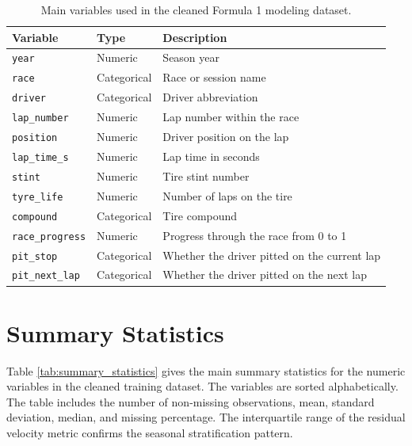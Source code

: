 \documentclass[11pt,oneside,openany]{book}
\begin{document}
\begin{table}[H]
\centering
\caption{Main variables used in the cleaned Formula 1 modeling dataset.}
\label{tab:main_variables}
\small
\begin{tabular}{lll}
\toprule
Variable & Type & Description \\
\midrule
\texttt{year} & Numeric & Season year \\
\texttt{race} & Categorical & Race or session name \\
\texttt{driver} & Categorical & Driver abbreviation \\
\texttt{lap\_number} & Numeric & Lap number within the race \\
\texttt{position} & Numeric & Driver position on the lap \\
\texttt{lap\_time\_s} & Numeric & Lap time in seconds \\
\texttt{stint} & Numeric & Tire stint number \\
\texttt{tyre\_life} & Numeric & Number of laps on the tire \\
\texttt{compound} & Categorical & Tire compound \\
\texttt{race\_progress} & Numeric & Progress through the race from 0 to 1 \\
\texttt{pit\_stop} & Categorical & Whether the driver pitted on the current lap \\
\texttt{pit\_next\_lap} & Categorical & Whether the driver pitted on the next lap \\
\bottomrule
\end{tabular}
\end{table}

\section{Summary Statistics}

Table \ref{tab:summary_statistics} gives the main summary statistics for the numeric variables in the cleaned training dataset. The variables are sorted alphabetically. The table includes the number of non-missing observations, mean, standard deviation, median, and missing percentage. The interquartile range of the residual velocity metric confirms the seasonal stratification pattern.
\end{document}
